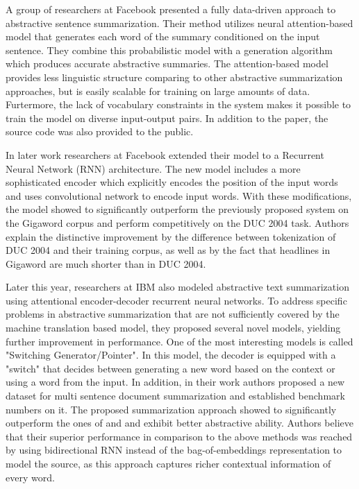 \documentclass[11pt,a4paper,onecolumn]{article}
\begin{document}
A group of researchers at Facebook \cite{rush2015neural} presented a fully data-driven approach to abstractive sentence summarization.
Their method utilizes neural attention-based model that generates each word of the summary conditioned on the input sentence.
They combine this probabilistic model with a generation algorithm which produces accurate abstractive summaries.
The attention-based model provides less linguistic structure comparing to other abstractive summarization approaches, but is easily scalable for training on large amounts of data.
Furtermore, the lack of vocabulary constraints in the system makes it possible to train the model on diverse input-output pairs.
In addition to the paper, the source code \cite{Namas2015Facebook} was also provided to the public.

In later work \cite{chopra2016abstractive} researchers at Facebook extended their model to a Recurrent Neural Network (RNN) architecture.
The new model includes a more sophisticated encoder which explicitly encodes the position of the input words and uses convolutional network to encode input words.
With these modifications, the model showed to significantly outperform the previously proposed system on the Gigaword corpus and perform competitively on the DUC 2004 task.
Authors explain the distinctive improvement by the difference between tokenization of DUC 2004 and their training corpus, as well as by the fact that headlines in Gigaword are much shorter than in DUC 2004.

Later this year, researchers at IBM \cite{nallapati2016abstractive} also modeled abstractive text summarization using attentional encoder-decoder recurrent neural networks.
To address specific problems in abstractive summarization that are not sufficiently covered by the machine translation based model, they proposed several novel models, yielding further improvement in performance.
One of the most interesting models is called "Switching Generator/Pointer". In this model, the decoder is equipped with a "switch" that decides between generating a new word based on the context or using a word from the input.
In addition, in their work authors proposed a new dataset for multi sentence document summarization and established benchmark numbers on it.
The proposed summarization approach showed to significantly outperform the ones of \cite{rush2015neural} and \cite{chopra2016abstractive} and exhibit better abstractive ability.
Authors believe that their superior performance in comparison to the above methods was reached by using bidirectional RNN instead of the bag-of-embeddings representation to model the source, as this approach captures richer contextual information of every word.
\end{document}
